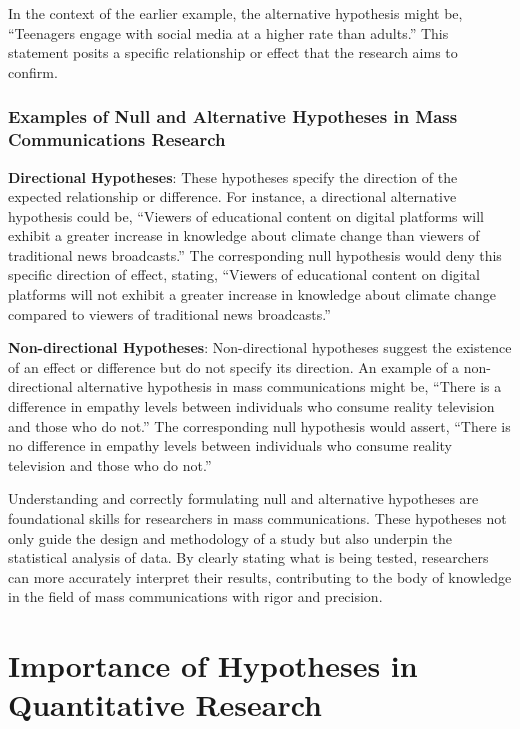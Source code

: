 \documentclass[
]{book}
\begin{document}
In the context of the earlier example, the alternative hypothesis might be, ``Teenagers engage with social media at a higher rate than adults.'' This statement posits a specific relationship or effect that the research aims to confirm.

\hypertarget{examples-of-null-and-alternative-hypotheses-in-mass-communications-research}{%
\subsubsection*{Examples of Null and Alternative Hypotheses in Mass Communications Research}\label{examples-of-null-and-alternative-hypotheses-in-mass-communications-research}}

\textbf{Directional Hypotheses}: These hypotheses specify the direction of the expected relationship or difference. For instance, a directional alternative hypothesis could be, ``Viewers of educational content on digital platforms will exhibit a greater increase in knowledge about climate change than viewers of traditional news broadcasts.'' The corresponding null hypothesis would deny this specific direction of effect, stating, ``Viewers of educational content on digital platforms will not exhibit a greater increase in knowledge about climate change compared to viewers of traditional news broadcasts.''

\textbf{Non-directional Hypotheses}: Non-directional hypotheses suggest the existence of an effect or difference but do not specify its direction. An example of a non-directional alternative hypothesis in mass communications might be, ``There is a difference in empathy levels between individuals who consume reality television and those who do not.'' The corresponding null hypothesis would assert, ``There is no difference in empathy levels between individuals who consume reality television and those who do not.''

Understanding and correctly formulating null and alternative hypotheses are foundational skills for researchers in mass communications. These hypotheses not only guide the design and methodology of a study but also underpin the statistical analysis of data. By clearly stating what is being tested, researchers can more accurately interpret their results, contributing to the body of knowledge in the field of mass communications with rigor and precision.

\hypertarget{importance-of-hypotheses-in-quantitative-research}{%
\section*{Importance of Hypotheses in Quantitative Research}\label{importance-of-hypotheses-in-quantitative-research}}
\end{document}
